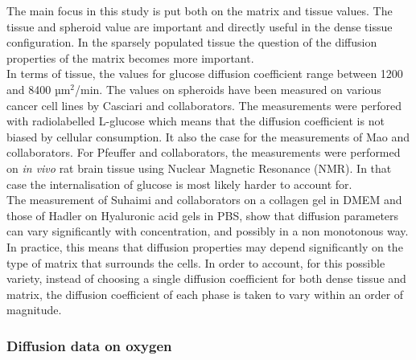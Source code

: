 \documentclass[11pt,a4paper]{article}
\begin{document}
The main focus in this study is put both on the matrix and tissue values. The tissue and spheroid value are important and directly useful in the dense tissue configuration. In the sparsely populated tissue the question of the diffusion properties of the matrix becomes more important.\\

In terms of tissue, the values for glucose diffusion coefficient range between 1200 and 8400 µm$^2$/min. The values on spheroids have been measured on various cancer cell lines by Casciari and collaborators.\cite{Casciari1988} The measurements were perfored with radiolabelled L-glucose which means that the diffusion coefficient is not biased by cellular consumption. It also the case for the measurements of Mao and collaborators. For Pfeuffer and collaborators, the measurements were performed on \textit{in vivo} rat brain tissue using Nuclear Magnetic Resonance (NMR). In that case the internalisation of glucose is most likely harder to account for.\\

The measurement of Suhaimi and collaborators on a collagen gel in DMEM and those of Hadler on Hyaluronic acid gels in PBS, show that diffusion parameters can vary significantly with concentration, and possibly in a non monotonous way.\cite{Suhaimi2016}\cite{Hadler1980} In practice, this means that diffusion properties may depend significantly on the type of matrix that surrounds the cells. In order to account, for this possible variety, instead of choosing a single diffusion coefficient for both dense tissue and matrix, the diffusion coefficient of each phase is taken to vary within an order of magnitude.\\ 

\subsubsection{Diffusion data on oxygen}
\end{document}
